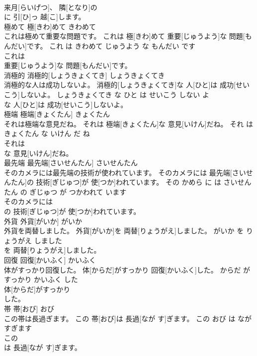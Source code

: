 \documentclass[8pt]{extreport}
\begin{document}
\begin{CJK}{UTF8}{min}
\\	来月[らいげつ]、 隣[となり]の
\\	に 引[ひ]っ 越[こ]します。			
\\	極めて	極[きわ]めて	きわめて	
\\	これは極めて重要な問題です。	これは 極[きわ]めて 重要[じゅうよう]な 問題[もんだい]です。	これ は きわめて じゅうよう な もんだい です	
\\	これは
\\	重要[じゅうよう]な 問題[もんだい]です。			
\\	消極的	消極的[しょうきょくてき]	しょうきょくてき	
\\	消極的な人は成功しないよ。	消極的[しょうきょくてき]な 人[ひと]は 成功[せいこう]しないよ。	しょうきょくてき な ひと は せいこう しない よ	
\\	な 人[ひと]は 成功[せいこう]しないよ。			
\\	極端	極端[きょくたん]	きょくたん	
\\	それは極端な意見だね。	それは 極端[きょくたん]な 意見[いけん]だね。	それ は きょくたん な いけん だ ね	
\\	それは
\\	な 意見[いけん]だね。			
\\	最先端	最先端[さいせんたん]	さいせんたん	
\\	そのカメラには最先端の技術が使われています。	そのカメラには 最先端[さいせんたん]の 技術[ぎじゅつ]が 使[つか]われています。	その かめら に は さいせんたん の ぎじゅつ が つかわれて います	
\\	そのカメラには
\\	の 技術[ぎじゅつ]が 使[つか]われています。			
\\	外貨	外貨[がいか]	がいか	
\\	外貨を両替しました。	外貨[がいか]を 両替[りょうがえ]しました。	がいか を りょうがえ しました	
\\	を 両替[りょうがえ]しました。			
\\	回復	回復[かいふく]	かいふく	
\\	体がすっかり回復した。	体[からだ]がすっかり 回復[かいふく]した。	からだ が すっかり かいふく した	
\\	体[からだ]がすっかり
\\	した。			
\\	帯	帯[おび]	おび	
\\	この帯は長過ぎます。	この 帯[おび]は 長過[なが す]ぎます。	この おび は なが すぎます	
\\	この
\\	は 長過[なが す]ぎます。			

\end{CJK}
\end{document}
